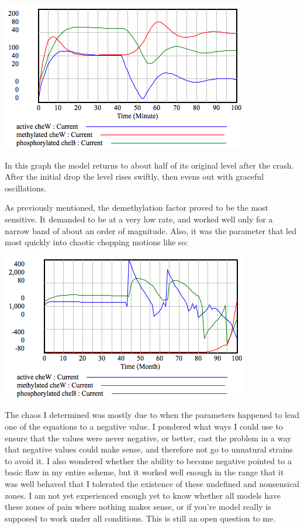 \documentclass[12pt]{article}
\begin{document}
\includegraphics[scale=0.8]{ideal.png}

In this graph the model returns to about half of its original level after the crash.  After the initial drop the level rises swiftly, then evens out with graceful oscillations.  

As previously mentioned, the demethylation factor proved to be the most sensitive.  It demanded to be at a very low rate, and worked well only for a narrow band of about an order of magnitude.  Also, it was the parameter that led most quickly into chaotic chopping motions like so:

\includegraphics[scale=0.8]{chaotic.png}

The chaos I determined was mostly due to when the parameters happened to lead one of the equations to a negative value.  I pondered what ways I could use to ensure that the values were never negative, or better, cast the problem in a way that negative values could make sense, and therefore not go to unnatural strains to avoid it.  I also wondered whether the ability to become negative pointed to a basic flaw in my entire scheme, but it worked well enough in the range that it was well behaved that I tolerated the existence of these undefined and nonsensical zones.  I am not yet experienced enough yet to know whether all models have these zones of pain where nothing makes sense, or if you're model really is supposed to work under all conditions.  This is still an open question to me.  
\end{document}
